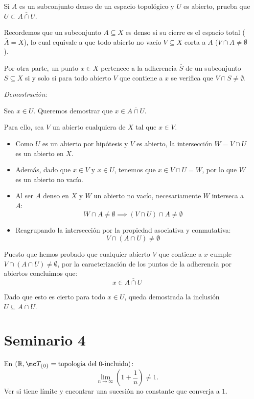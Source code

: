 \begin{ejer}
[57] Si $A$ es un subconjunto denso de un espacio topológico y $U$ es abierto, prueba que $U\subset \overline{A\cap U}$.
\end{ejer}
\begin{sol}
    Recordemos que un subconjunto $A \subseteq X$ es denso si su cierre es el espacio total ($\overline{A} = X$), lo cual equivale a que todo abierto no vacío $V \subseteq X$ corta a $A$ ($V \cap A \neq \emptyset$).

    Por otra parte, un punto $x \in X$ pertenece a la adherencia $\overline{S}$ de un subconjunto $S \subseteq X$ si y solo si para todo abierto $V$ que contiene a $x$ se verifica que $V \cap S \neq \emptyset$.

    \medskip

    \textit{Demostración:}

    Sea $x \in U$. Queremos demostrar que $x \in \overline{A \cap U}$.

    Para ello, sea $V$ un abierto cualquiera de $X$ tal que $x \in V$.
    \begin{itemize}
        \item Como $U$ es un abierto por hipótesis y $V$ es abierto, la intersección $W = V \cap U$ es un abierto en $X$.
        \item Además, dado que $x \in V$ y $x \in U$, tenemos que $x \in V \cap U = W$, por lo que $W$ es un abierto no vacío.
        \item Al ser $A$ denso en $X$ y $W$ un abierto no vacío, necesariamente $W$ interseca a $A$:
        \[
            W \cap A \neq \emptyset \implies (V \cap U) \cap A \neq \emptyset
        \]
        \item Reagrupando la intersección por la propiedad asociativa y conmutativa:
        \[
            V \cap (A \cap U) \neq \emptyset
        \]
    \end{itemize}

    Puesto que hemos probado que cualquier abierto $V$ que contiene a $x$ cumple $V \cap (A \cap U) \neq \emptyset$, por la caracterización de los puntos de la adherencia por abiertos concluimos que:
    \[
        x \in \overline{A \cap U}
    \]

    Dado que esto es cierto para todo $x \in U$, queda demostrada la inclusión $U \subseteq \overline{A \cap U}$.
\end{sol}

\section{Seminario 4}
\begin{ejer}[66]
En $(\mathbb{R}, \mc T_{\{0\}} = \text{topología del } 0\text{-incluido})$:
\[
    \lim_{n \to \infty} \left(1 + \frac{1}{n}\right) \ne 1. \text{}
\]
Ver si tiene límite y encontrar una sucesión no constante que converja a $1$.
\end{ejer}

